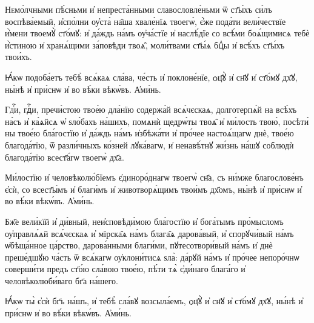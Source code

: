 \documentclass{article}          %
\makeatletter
\def\cu@lettrine{\lettrine[lines=2,nindent=0pt,loversize=-0.15]}
\def\cuLettrine{\cu@tokenizeletter\cu@lettrine}
\newcommand{\header}[1]{{\Large\centering\cuKinovar{#1}\par}\nopagebreak} %
\makeatother
\begin{document}
\header{Моли́тва \cuNum{4}}
\cuLettrine
Немо́лчными пѣ́сньми и҆ непреста́нными славословле́ньми ѿ ст҃ы́хъ си́лъ воспѣва́емый, и҆спо́лни оу҆ста̀ на̑ша хвале́нїѧ твоегѡ̀, є҆́же пода́ти вели́чествїе и҆̀мени твоемꙋ̀ ст҃о́мꙋ: и҆ да́ждь на́мъ оу҆ча́стїе и҆ наслѣ́дїе со всѣ́ми боѧ́щимисѧ тебѐ и҆̀стиною и҆ хранѧ́щими за́повѣди твоѧ̑, моли́твами ст҃ы́ѧ бцⷣы и҆ всѣ́хъ ст҃ы́хъ твои́хъ.
\par
\cuKinovar Ꙗ҆́кѡ подоба́етъ тебѣ̀ всѧ́каѧ сла́ва, че́сть и҆ поклоне́нїе, ѻц҃ꙋ̀ и҆ сн҃ꙋ и҆ ст҃о́мꙋ дх҃ꙋ, ны́нѣ и҆ при́снѡ и҆ во вѣ́ки вѣкѡ́въ.
\cuKinovar А҆ми́нь.

\header{Моли́тва \cuNum{5}}
\cuLettrine
Гдⷭ҇и, гдⷭ҇и, пречи́стою твое́ю дла́нїю содержа́й всѧ́чєскаѧ, долготерпѧ́й на всѣ́хъ на́съ и҆ ка́ѧйсѧ ѡ҆ ѕло́бахъ на́шихъ, помѧнѝ щедрѡ́ты твоѧ̑ и҆ ми́лость твою̀, посѣти́ ны твое́ю бла́гостїю и҆ да́ждь на́мъ и҆збѣжа́ти и҆ про́чее настоѧ́щагѡ днѐ, твое́ю благода́тїю, ѿ разли́чныхъ ко́зней лꙋка́вагѡ, и҆ ненавѣ́тнꙋ жи́знь на́шꙋ соблюдѝ благода́тїю всест҃а́гѡ твоегѡ̀ дх҃а.
\par
\cuKinovar Ми́лостїю и҆ человѣколю́бїемъ є҆диноро́днагѡ твоегѡ̀ сн҃а, съ ни́мже благослове́нъ є҆сѝ, со всест҃ы́мъ и҆ благи́мъ и҆ животворѧ́щимъ твои́мъ дх҃омъ, ны́нѣ и҆ при́снѡ и҆ во вѣ́ки вѣкѡ́въ.
\cuKinovar А҆ми́нь.

\header{Моли́тва \cuNum{6}}
\cuLettrine
Бж҃е вели́кїй и҆ ди́вный, неи҆сповѣди́мою бла́гостїю и҆ бога́тымъ про́мысломъ оу҆правлѧ́ѧй всѧ́чєскаѧ и҆ мїрска̑ѧ на́мъ блага̑ѧ дарова́вый, и҆ спорꙋчи́вый на́мъ ѡ҆бѣща́нное ца́рство, дарова́нными благи́ми, пꙋтесотвори́вый на́мъ и҆ днѐ преше́дшꙋю ча́сть ѿ всѧ́кагѡ оу҆клони́тисѧ ѕла̀: да́рꙋй на́мъ и҆ про́чее непоро́чнѡ соверши́ти предъ ст҃о́ю сла́вою твое́ю, пѣ́ти тѧ̀ є҆ди́наго блага́го и҆ человѣколюби́ваго бг҃а на́шего.
\par
\cuKinovar Ꙗ҆́кѡ ты̀ є҆сѝ бг҃ъ на́шъ, и҆ тебѣ̀ сла́вꙋ возсыла́емъ, ѻц҃ꙋ̀ и҆ сн҃ꙋ и҆ ст҃о́мꙋ дх҃ꙋ, ны́нѣ и҆ при́снѡ и҆ во вѣ́ки вѣкѡ́въ.
\cuKinovar А҆ми́нь.
\end{document}
